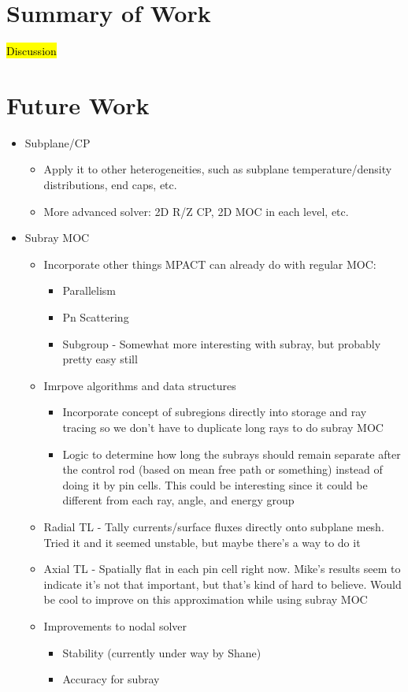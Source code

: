 \section{Summary of Work}

\hl{Discussion}

\section{Future Work}

\begin{itemize}
    \item Subplane/CP
    \begin{itemize}
        \item Apply it to other heterogeneities, such as subplane temperature/density distributions, end caps, etc.
        \item More advanced solver: 2D R/Z CP, 2D MOC in each level, etc.
    \end{itemize}
    \item Subray MOC
    \begin{itemize}
        \item Incorporate other things MPACT can already do with regular MOC:
        \begin{itemize}
            \item Parallelism
            \item Pn Scattering
            \item Subgroup - Somewhat more interesting with subray, but probably pretty easy still
        \end{itemize}
        \item Imrpove algorithms and data structures
        \begin{itemize}
            \item Incorporate concept of subregions directly into storage and ray tracing so we don't have to duplicate long rays to do subray MOC
            \item Logic to determine how long the subrays should remain separate after the control rod (based on mean free path or something) instead of doing it by pin cells.  This could be interesting since it could be different from each ray, angle, and energy group
        \end{itemize}
        \item Radial TL - Tally currents/surface fluxes directly onto subplane mesh.  Tried it and it seemed unstable, but maybe there's a way to do it
        \item Axial TL - Spatially flat in each pin cell right now.  Mike's results seem to indicate it's not that important, but that's kind of hard to believe.  Would be cool to improve on this approximation while using subray MOC
        \item Improvements to nodal solver
        \begin{itemize}
            \item Stability (currently under way by Shane)
            \item Accuracy for subray
        \end{itemize}
    \end{itemize}
\end{itemize}